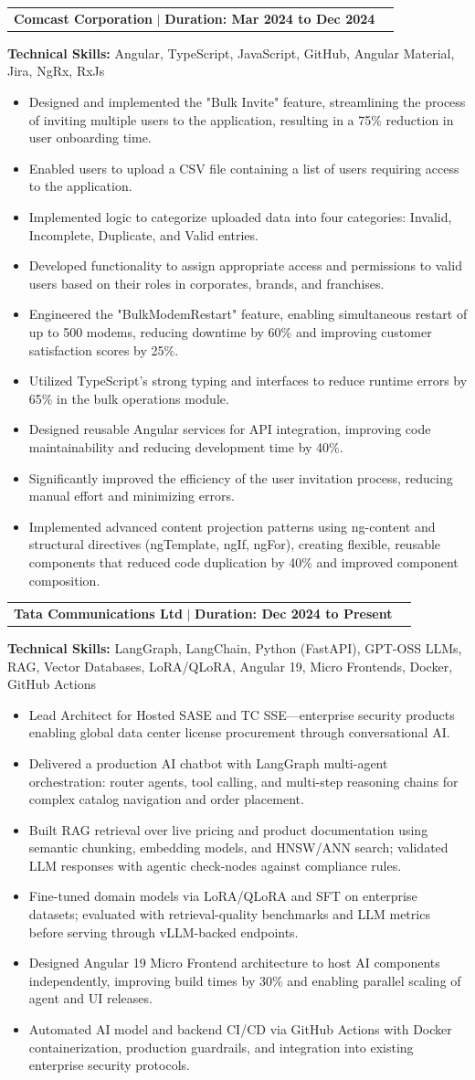 \documentclass[letterpaper,10pt]{article}
\makeatletter
\newcommand{\resumeItem}[1]{
  \item\small{
    {#1 \vspace{-2pt}}
  }
}
\newcommand{\resumeProjectHeading}[2]{
    \item
    \begin{tabular*}{1.001\textwidth}{l@{\extracolsep{\fill}}r}
      \small#1 & \textbf{\small #2}\\
    \end{tabular*}\vspace{-7pt}
}
\newcommand{\resumeItemListStart}{\begin{itemize}}
\newcommand{\resumeItemListEnd}{\end{itemize}\vspace{-5pt}}
\makeatother
\begin{document}
\resumeProjectHeading
{\textbf{Comcast Corporation} $|$ \textbf{Duration: Mar 2024 to Dec 2024}} {}
\resumeItem{\textbf{Technical Skills:} Angular, TypeScript, JavaScript, GitHub, Angular Material, Jira, NgRx, RxJs}
\resumeItemListStart
\resumeItem{Designed and implemented the "Bulk Invite" feature, streamlining the process of inviting multiple users to the application, resulting in a 75\% reduction in user onboarding time. }
\resumeItem{Enabled users to upload a CSV file containing a list of users requiring access to the application.}
\resumeItem{Implemented logic to categorize uploaded data into four categories: Invalid, Incomplete, Duplicate, and Valid entries.}
\resumeItem{Developed functionality to assign appropriate access and permissions to valid users based on their roles in corporates, brands, and franchises.}
\resumeItem{Engineered the "BulkModemRestart" feature, enabling simultaneous restart of up to 500 modems, reducing downtime by 60\% and improving customer satisfaction scores by 25\%. }
\resumeItem{Utilized TypeScript's strong typing and interfaces to reduce runtime errors by 65\% in the bulk operations module.}
\resumeItem{Designed reusable Angular services for API integration, improving code maintainability and reducing development time by 40\%.}
\resumeItem{Significantly improved the efficiency of the user invitation process, reducing manual effort and minimizing errors.}
\resumeItem{Implemented advanced content projection patterns using ng-content and structural directives (ngTemplate, ngIf, ngFor), creating flexible, reusable components that reduced code duplication by 40\% and improved component composition.}
\resumeItemListEnd

\resumeProjectHeading
{\textbf{Tata Communications Ltd} $|$ \textbf{Duration: Dec 2024 to Present}} {}
\resumeItem{\textbf{Technical Skills:} LangGraph, LangChain, Python (FastAPI), GPT-OSS LLMs, RAG, Vector Databases, LoRA/QLoRA, Angular 19, Micro Frontends, Docker, GitHub Actions}
\resumeItemListStart
\resumeItem{Lead Architect for {Hosted SASE} and {TC SSE}---enterprise security products enabling global data center license procurement through conversational AI.}
\resumeItem{Delivered a production AI chatbot with {LangGraph multi-agent orchestration}: router agents, tool calling, and multi-step reasoning chains for complex catalog navigation and order placement.}
\resumeItem{Built RAG retrieval over live pricing and product documentation using semantic chunking, embedding models, and HNSW/ANN search; validated LLM responses with agentic check-nodes against compliance rules.}
\resumeItem{Fine-tuned domain models via {LoRA/QLoRA and SFT} on enterprise datasets; evaluated with retrieval-quality benchmarks and LLM metrics before serving through {vLLM}-backed endpoints.}
\resumeItem{Designed Angular 19 Micro Frontend architecture to host AI components independently, improving build times by 30\% and enabling parallel scaling of agent and UI releases.}
\resumeItem{Automated AI model and backend CI/CD via GitHub Actions with Docker containerization, production guardrails, and integration into existing enterprise security protocols.}
\resumeItemListEnd
\end{document}
